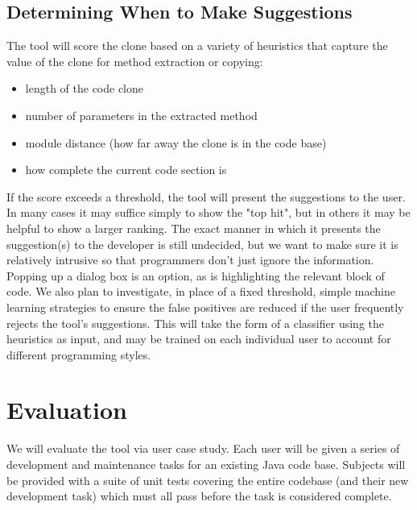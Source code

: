 \documentclass[preprint,10pt]{sigplanconf}
\begin{document}
\subsection{Determining When to Make Suggestions}
The tool will score the clone based on a variety of heuristics that
capture the value of the clone for method extraction or copying:

\begin{itemize}
  \item length of the code clone
  \item number of parameters in the extracted method
  \item module distance (how far away the clone is in the code base)
  \item how complete the current code section is
\end{itemize}

If the score exceeds a threshold, the tool will present the 
suggestions to the user.  In many cases it may suffice simply to show
the "top hit", but in others it may be helpful to show a larger
ranking.  The exact manner in which it presents the suggestion(s) to
the developer is still undecided, but we want to make sure it is
relatively intrusive so that programmers don't just ignore the
information. Popping up a dialog box is an option, as is highlighting
the relevant block of code. We also plan to investigate, in place of a
fixed threshold, simple machine learning strategies to ensure the
false positives are reduced if the user frequently rejects the tool's
suggestions.  This will take the form of a classifier using the
heuristics as input, and may be trained on each individual user to
account for different programming styles.

\section{Evaluation}


We will evaluate the tool via user case study. Each user will be given
a series of development and maintenance tasks for an existing Java
code base. Subjects will be provided with a suite of unit tests covering the
entire codebase (and their new development task) which must all pass
before the task is considered complete.
\end{document}
